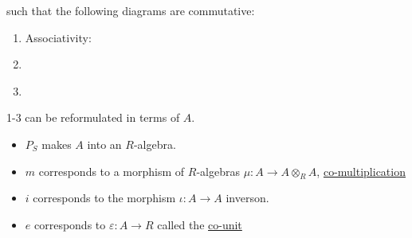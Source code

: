 \documentclass{article}
\theoremstyle{definition}
\numberwithin{theorem}{subsection}
\begin{document}
    such that the following diagrams are commutative:

    \begin{enumerate}[label=\arabic*)]
        \item Associativity:
        
        \begin{center}
        \end{center}
        
        \item 
        \begin{center}
        \end{center}

        \item 

        \begin{center}
        \end{center}

    \end{enumerate} 

    1-3 can be reformulated in terms of \(A\).

    \begin{itemize}
        \item \(P_S\) makes \(A\) into an \(R\)-algebra.
        \item \(m\) corresponds to a morphism of \(R\)-algebras \(\mu: A \to A \otimes_R A\), \underline{co-multiplication}
        \item \(i\) corresponds to the morphism \(\iota : A\to A\) inverson.
        \item \(e\) corresponds to \(\varepsilon : A \to R\) called the \underline{co-unit} 
    \end{itemize} 
\end{document}
